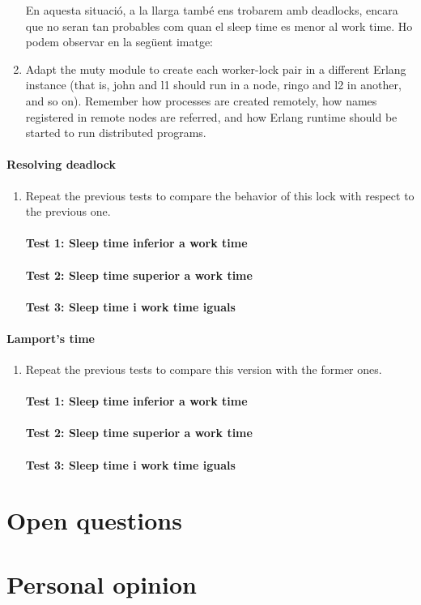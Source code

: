 \documentclass[a4paper, 10pt]{article}
\begin{document}
\begin{enumerate}
En aquesta situació, a la llarga també ens trobarem amb deadlocks, encara que no seran tan probables com quan el sleep time es menor al work time. Ho podem observar en la següent imatge:

\item Adapt the muty module to create each worker-lock pair in a different Erlang instance (that is, john and l1 should run in a node, ringo and l2 in another, and so on). Remember how processes are created remotely, how names registered in remote nodes are referred, and how Erlang runtime should be started to run distributed programs.  
\end{enumerate}

\paragraph[bold]{Resolving deadlock}
\begin{enumerate}
\item Repeat the previous tests to compare the behavior of this lock with respect to the previous one.
\paragraph[bold]{Test 1: Sleep time inferior a work time}
\paragraph[bold]{Test 2: Sleep time superior a work time}
\paragraph[bold]{Test 3: Sleep time i work time iguals}
\end{enumerate}

\paragraph[bold]{Lamport’s time}
\begin{enumerate}
\item Repeat the previous tests to compare this version with the former ones.
\paragraph[bold]{Test 1: Sleep time inferior a work time}
\paragraph[bold]{Test 2: Sleep time superior a work time}
\paragraph[bold]{Test 3: Sleep time i work time iguals}
\end{enumerate}

\newpage
\section{Open questions}
\section{Personal opinion}
\end{document}
